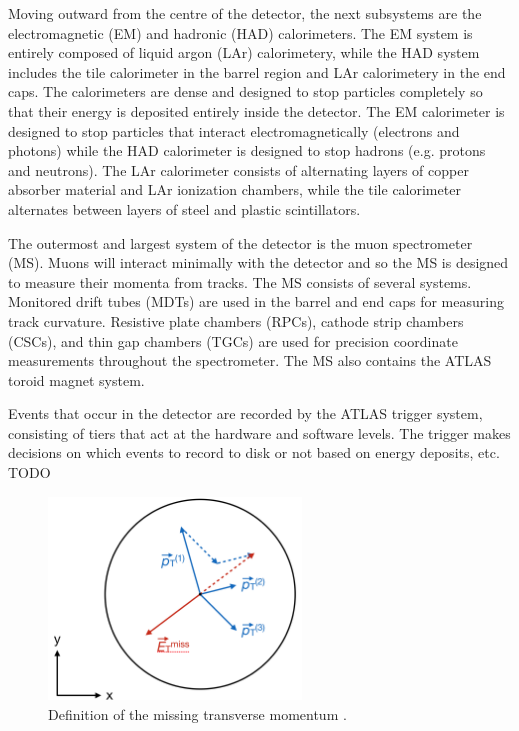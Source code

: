 Moving outward from the centre of the detector, the next subsystems are the electromagnetic (EM) and hadronic (HAD) calorimeters. The EM system is entirely composed of liquid argon (LAr) calorimetery, while the HAD system includes the tile calorimeter in the barrel region and LAr calorimetery in the end caps. The calorimeters are dense and designed to stop particles completely so that their energy is deposited entirely inside the detector. The EM calorimeter is designed to stop particles that interact electromagnetically (electrons and photons) while the HAD calorimeter is designed to stop hadrons (e.g. protons and neutrons). The LAr calorimeter consists of alternating layers of copper absorber material and LAr ionization chambers, while the tile calorimeter alternates between layers of steel and plastic scintillators. 

The outermost and largest system of the detector is the muon spectrometer (MS). Muons will interact minimally with the detector and so the MS is designed to measure their momenta from tracks. The MS consists of several systems. Monitored drift tubes (MDTs) are used in the barrel and end caps for measuring track curvature. Resistive plate chambers (RPCs), cathode strip chambers (CSCs), and thin gap chambers (TGCs) are used for precision coordinate measurements throughout the spectrometer. The MS also contains the ATLAS toroid magnet system.

Events that occur in the detector are recorded by the ATLAS trigger system, consisting of tiers that act at the hardware and software levels. The trigger makes decisions on which events to record to disk or not based on energy deposits, etc. {\color{red}TODO}

\begin{figure}[!htb]
\centering
\includegraphics[width=0.6\textwidth]{Figures/etmiss.png}
\caption{Definition of the missing transverse momentum \etmissvec.}
\label{fig:etmiss}
\end{figure}

\clearpage

